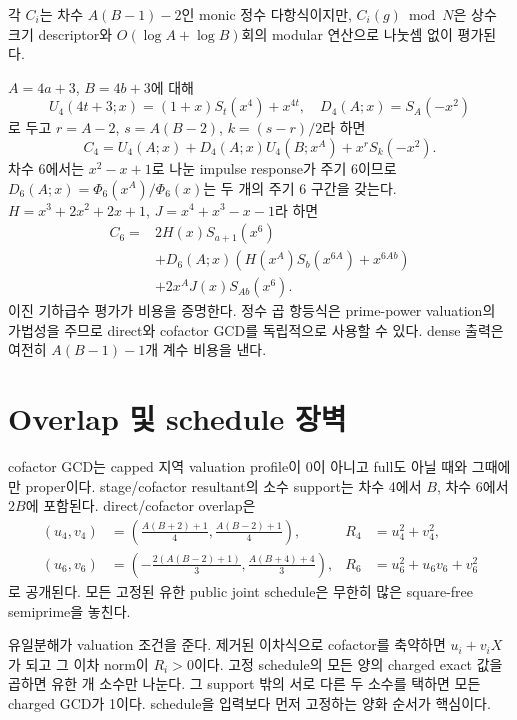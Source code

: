 \documentclass[11pt]{article}
\begin{document}
{}
각 \(C_i\)는 차수 \(A(B-1)-2\)인 monic
정수 다항식이지만, \(C_i(g)\bmod N\)은 상수 크기 descriptor와
\(O(\log A+\log B)\)회의 modular 연산으로 나눗셈 없이 평가된다.

\begin{claimproof}
\(A=4a+3\), \(B=4b+3\)에 대해
\[
U_4(4t+3;x)=(1+x)S_t(x^4)+x^{4t},\quad
D_4(A;x)=S_A(-x^2)
\]
로 두고 \(r=A-2\), \(s=A(B-2)\), \(k=(s-r)/2\)라 하면
\[
C_4=U_4(A;x)+D_4(A;x)U_4(B;x^A)+x^rS_k(-x^2).
\]
차수 6에서는 \(x^2-x+1\)로 나눈 impulse response가 주기 6이므로
\(D_6(A;x)=\Phi_6(x^A)/\Phi_6(x)\)는 두 개의 주기 6 구간을 갖는다.
\(H=x^3+2x^2+2x+1\), \(J=x^4+x^3-x-1\)라 하면
\[
\begin{split}
C_6={}&2H(x)S_{a+1}(x^6)\\
&+D_6(A;x)(H(x^A)S_b(x^{6A})+x^{6Ab})\\
&+2x^AJ(x)S_{Ab}(x^6).
\end{split}
\]
이진 기하급수 평가가 비용을 증명한다. 정수 곱 항등식은
prime-power valuation의 가법성을 주므로 direct와 cofactor GCD를
독립적으로 사용할 수 있다. dense 출력은 여전히
\(A(B-1)-1\)개 계수 비용을 낸다.
\end{claimproof}

\section{Overlap 및 schedule 장벽}

{}
cofactor GCD는 capped 지역 valuation
profile이 0이 아니고 full도 아닐 때와 그때에만 proper이다.
stage/cofactor resultant의 소수 support는 차수 4에서 \(B\), 차수 6에서
\(2B\)에 포함된다. direct/cofactor overlap은
\[
\begin{aligned}
(u_4,v_4)&=\left(\frac{A(B+2)+1}{4},
                 \frac{A(B-2)+1}{4}\right),&
R_4&=u_4^2+v_4^2,\\
(u_6,v_6)&=\left(-\frac{2(A(B-2)+1)}3,
                 \frac{A(B+4)+4}3\right),&
R_6&=u_6^2+u_6v_6+v_6^2
\end{aligned}
\]
로 공개된다. 모든 고정된 유한 public joint schedule은 무한히 많은
square-free semiprime을 놓친다.

\begin{claimproof}
유일분해가 valuation 조건을 준다. 제거된 이차식으로 cofactor를
축약하면 \(u_i+v_iX\)가 되고 그 이차 norm이 \(R_i>0\)이다. 고정
schedule의 모든 양의 charged exact 값을 곱하면 유한 개 소수만 나눈다.
그 support 밖의 서로 다른 두 소수를 택하면 모든 charged GCD가 1이다.
schedule을 입력보다 먼저 고정하는 양화 순서가 핵심이다.
\end{claimproof}
\end{document}
